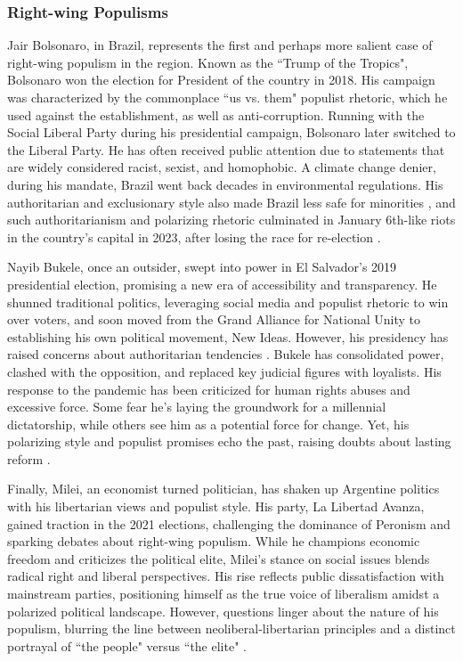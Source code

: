 \documentclass[12pt,letterpaper]{article}
\begin{document}
\vspace{.25cm}
\subsubsection{Right-wing Populisms}

\vspace{.25cm}
Jair Bolsonaro, in Brazil, represents the first and perhaps more salient case of right-wing populism in the region. Known as the ``Trump of the Tropics", Bolsonaro won the election for President of the country in 2018. His campaign was characterized by the commonplace ``us vs. them" populist rhetoric, which he used against the establishment, as well as anti-corruption. Running with the Social Liberal Party during his presidential campaign, Bolsonaro later switched to the Liberal Party. He has often received public attention due to statements that are widely considered racist, sexist, and homophobic. A climate change denier, during his mandate, Brazil went back decades in environmental regulations. His authoritarian and exclusionary style also made Brazil less safe for minorities\autocite{chueriPeopleEliteJair2018} , and such authoritarianism and polarizing rhetoric culminated in January 6th-like riots in the country's capital in 2023, after losing the race for re-election\autocite{richardBrazilCollorCorruption} . 

Nayib Bukele, once an outsider, swept into power in El Salvador's 2019 presidential election, promising a new era of accessibility and transparency. He shunned traditional politics, leveraging social media and populist rhetoric to win over voters, and soon moved from the Grand Alliance for National Unity to establishing his own political movement, New Ideas. However, his presidency has raised concerns about authoritarian tendencies\autocite{charlesSignificanceNayibBukele2019} . Bukele has consolidated power, clashed with the opposition, and replaced key judicial figures with loyalists. His response to the pandemic has been criticized for human rights abuses and excessive force. Some fear he's laying the groundwork for a millennial dictatorship, while others see him as a potential force for change. Yet, his polarizing style and populist promises echo the past, raising doubts about lasting reform\autocite{josemiguelCanStopSalvador2021} .

Finally, Milei, an economist turned politician, has shaken up Argentine politics with his libertarian views and populist style. His party, La Libertad Avanza, gained traction in the 2021 elections, challenging the dominance of Peronism and sparking debates about right-wing populism. While he champions economic freedom and criticizes the political elite, Milei's stance on social issues blends radical right and liberal perspectives. His rise reflects public dissatisfaction with mainstream parties, positioning himself as the true voice of liberalism amidst a polarized political landscape. However, questions linger about the nature of his populism, blurring the line between neoliberal-libertarian principles and a distinct portrayal of ``the people" versus ``the elite"\autocite{sendraMileiPopulistPeople2024} . 
\end{document}
